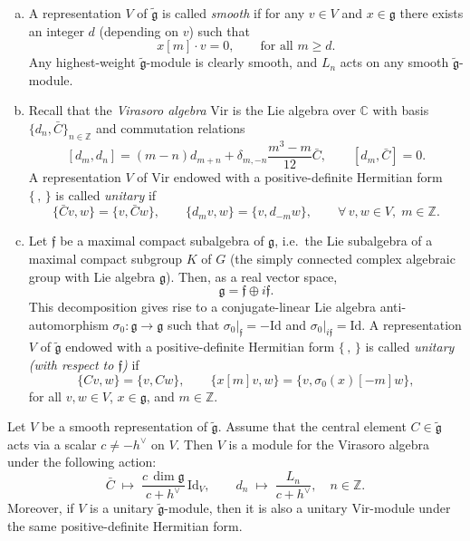 \documentclass[12pt]{article}
\begin{document}
\begin{definition}\label{def:3.2.3}
    \leavevmode
\begin{enumerate}[(a)]
\item A representation $V$ of $\widetilde{\mathfrak{g}}$ is called \emph{smooth} if for any $v\in V$ and $x\in\mathfrak{g}$ there exists an integer $d$ (depending on $v$) such that
\[
x[m]\cdot v = 0, \qquad \text{for all } m\ge d.
\tag{1}
\]
Any highest-weight $\widetilde{\mathfrak{g}}$-module is clearly smooth, and $L_n$ acts on any smooth $\widetilde{\mathfrak{g}}$-module.

\item Recall that the \emph{Virasoro algebra} $\mathrm{Vir}$ is the Lie algebra over $\mathbb{C}$ with basis $\{d_n,\bar{C}\}_{n\in\mathbb{Z}}$ and commutation relations
\[
[d_m,d_n]=(m-n)d_{m+n} + \delta_{m,-n}\frac{m^3-m}{12}\bar{C}, 
\qquad [d_m,\bar{C}]=0.
\tag{2}
\]
A representation $V$ of $\mathrm{Vir}$ endowed with a positive-definite Hermitian form $\{\, ,\, \}$ is called \emph{unitary} if
\[
\{\bar{C}v,w\}=\{v,\bar{C}w\},\qquad
\{d_m v,w\}=\{v,d_{-m}w\},\qquad
\forall\,v,w\in V,\; m\in\mathbb{Z}.
\]

\item Let $\mathfrak{f}$ be a maximal compact subalgebra of $\mathfrak{g}$, i.e.\ the Lie subalgebra of a maximal compact subgroup $K$ of $G$ (the simply connected complex algebraic group with Lie algebra $\mathfrak{g}$).  
Then, as a real vector space,
\[
\mathfrak{g}=\mathfrak{f}\oplus i\mathfrak{f}.
\tag{3}
\]
This decomposition gives rise to a conjugate-linear Lie algebra anti-automorphism $\sigma_0:\mathfrak{g}\to\mathfrak{g}$ such that $\sigma_0|_{\mathfrak{f}}=-\mathrm{Id}$ and $\sigma_0|_{i\mathfrak{f}}=\mathrm{Id}$.
A representation $V$ of $\widetilde{\mathfrak{g}}$ endowed with a positive-definite Hermitian form $\{\, ,\, \}$ is called \emph{unitary (with respect to $\mathfrak{f}$)} if
\[
\{Cv,w\}=\{v,Cw\},\qquad
\{x[m]v,w\}=\{v,\sigma_0(x)[-m]w\},
\]
for all $v,w\in V$, $x\in\mathfrak{g}$, and $m\in\mathbb{Z}$.
\end{enumerate}
\end{definition}

\begin{lemma}\label{lem:3.2.4}
Let $V$ be a smooth representation of $\widetilde{\mathfrak{g}}$.  
Assume that the central element $C\in\widetilde{\mathfrak{g}}$ acts via a scalar $c\ne -h^{\vee}$ on $V$.  
Then $V$ is a module for the Virasoro algebra under the following action:
\[
\bar{C}\;\mapsto\;\frac{c\,\dim\mathfrak{g}}{c+h^{\vee}}\,\mathrm{Id}_V,
\qquad
d_n\;\mapsto\;\frac{L_n}{c+h^{\vee}},\quad n\in\mathbb{Z}.
\tag{1}
\]
Moreover, if $V$ is a unitary $\widetilde{\mathfrak{g}}$-module, then it is also a unitary Vir-module under the same positive-definite Hermitian form.
\end{lemma}
\end{document}
